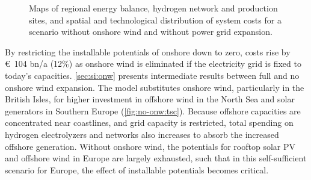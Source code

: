 \begin{figure}
    \centering
    \caption{Maps of regional energy balance, hydrogen network and production sites, and spatial and technological distribution of system costs for a scenario without onshore wind and without power grid expansion.}
    \label{fig:no-onw}
\end{figure}


By restricting the installable potentials of onshore down to zero, costs rise by
\euro~104 bn/a (12\%) as onshore wind is eliminated if the electricity grid is
fixed to today's capacities. \cref{sec:si:onw} presents intermediate results
between full and no onshore wind expansion. The model substitutes onshore wind,
particularly in the British Isles, for higher investment in offshore wind in the
North Sea and solar generators in Southern Europe (\cref{fig:no-onw:tsc}).
Because offshore capacities are concentrated near coastlines, and grid capacity
is restricted, total spending on hydrogen electrolyzers and networks also
increases to absorb the increased offshore generation. Without onshore wind, the
potentials for rooftop solar PV and offshore wind in Europe are largely
exhausted, such that in this self-sufficient scenario for Europe, the
effect of installable potentials becomes critical.

